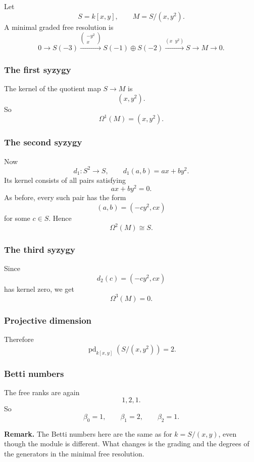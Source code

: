 \documentclass[12pt,a4paper]{article}
\theoremstyle{notespace}
\theoremstyle{definition}
\begin{document}
Let
\[
S=k[x,y], \qquad M=S/(x,y^2).
\]
A minimal graded free resolution is
\[
0 \longrightarrow S(-3) \xrightarrow{\begin{pmatrix}-y^2\\x\end{pmatrix}} S(-1)\oplus S(-2)
\xrightarrow{(x\;\;y^2)} S \longrightarrow M \longrightarrow 0.
\]

\subsubsection*{The first syzygy}

The kernel of the quotient map \(S\to M\) is
\[
(x,y^2).
\]
So
\[
\Omega^1(M)=(x,y^2).
\]

\subsubsection*{The second syzygy}

Now
\[
d_1:S^2\to S,\qquad d_1(a,b)=ax+by^2.
\]
Its kernel consists of all pairs satisfying
\[
ax+by^2=0.
\]
As before, every such pair has the form
\[
(a,b)=(-cy^2,cx)
\]
for some \(c\in S\).
Hence
\[
\Omega^2(M)\cong S.
\]

\subsubsection*{The third syzygy}

Since
\[
d_2(c)=(-cy^2,cx)
\]
has kernel zero, we get
\[
\Omega^3(M)=0.
\]

\subsubsection*{Projective dimension}

Therefore
\[
\operatorname{pd}_{k[x,y]}(S/(x,y^2))=2.
\]

\subsubsection*{Betti numbers}

The free ranks are again
\[
1,2,1.
\]
So
\[
\beta_0=1,\qquad \beta_1=2,\qquad \beta_2=1.
\]

\medskip

\textbf{Remark.}
The Betti numbers here are the same as for \(k=S/(x,y)\), even though the module is different.
What changes is the grading and the degrees of the generators in the minimal free resolution.
\end{document}
